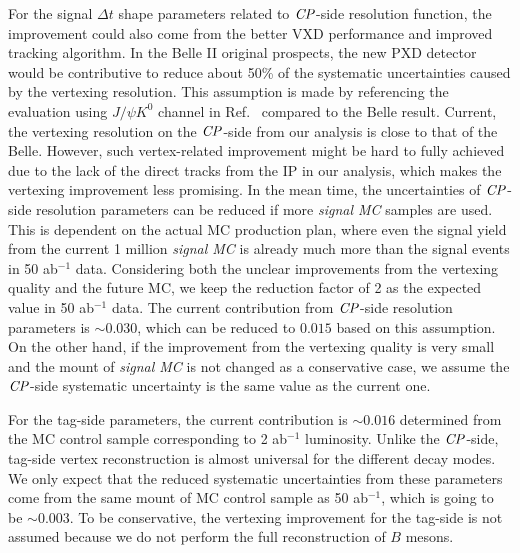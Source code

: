For the signal $\Delta t$ shape parameters related to $\it{CP}$-side resolution function, the improvement could also come from the better VXD performance and improved tracking algorithm.
In the Belle II original prospects, the new PXD detector would be contributive to reduce about 50\% of the systematic uncertainties caused by the vertexing resolution. This assumption is made by referencing the evaluation using $J/\psi K^0$ channel in Ref.~\cite{b2book} compared to the Belle result. Current, the vertexing resolution on the $\it{CP}$-side from our analysis is close to that of the Belle. However, such vertex-related improvement might be hard to fully achieved due to the lack of the direct tracks from the IP in our analysis, which makes the vertexing improvement less promising. 
In the mean time, the uncertainties of $\it{CP}$-side resolution parameters can be reduced if more \textit{signal MC} samples are used. This is dependent on the actual MC production plan, where even the signal yield from the current 1 million \textit{signal MC} is already much more than the signal events in 50 ab$^{-1}$ data. Considering both the unclear improvements from the vertexing quality and the future MC, we keep the reduction factor of 2 as the expected value in 50 ab$^{-1}$ data. The current contribution from $\it{CP}$-side resolution parameters is $\sim 0.030$, which can be reduced to $0.015$ based on this assumption. On the other hand, if the improvement from the vertexing quality is very small and the mount of \textit{signal MC} is not changed as a conservative case, we assume the $\it{CP}$-side systematic uncertainty is the same value as the current one.

For the tag-side parameters, the current contribution is $\sim 0.016$ determined from the MC control sample corresponding to 2 ab$^{-1}$ luminosity. Unlike the $\it{CP}$-side, tag-side vertex reconstruction is almost universal for the different decay modes. We only expect that the reduced systematic uncertainties from these parameters come from the same mount of MC control sample as 50 ab$^{-1}$, which is going to be $\sim 0.003$. To be conservative, the vertexing improvement for the tag-side is not assumed because we do not perform the full reconstruction of $B$ mesons. 


